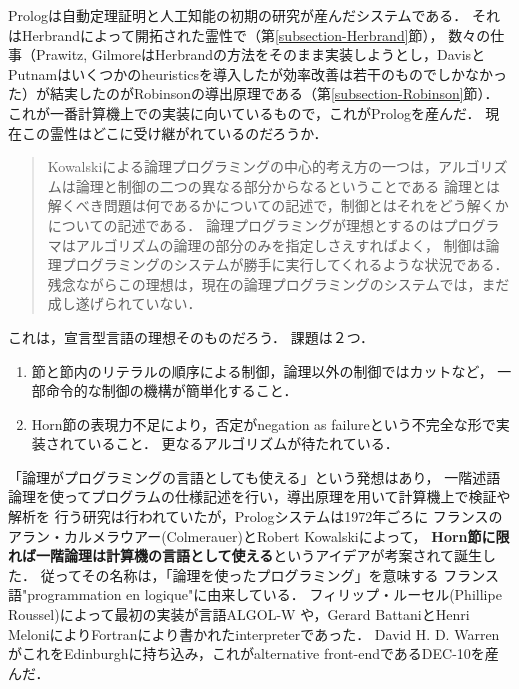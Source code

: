 \documentclass[uplatex, dvipdfmx]{jsreport}
\begin{document}
\begin{screen}
Prologは自動定理証明と人工知能の初期の研究が産んだシステムである．
それはHerbrandによって開拓された霊性で（第\ref{subsection-Herbrand}節），
数々の仕事（Prawitz, GilmoreはHerbrandの方法をそのまま実装しようとし，DavisとPutnamはいくつかのheuristicsを導入したが効率改善は若干のものでしかなかった）が結実したのがRobinsonの導出原理である（第\ref{subsection-Robinson}節）．
これが一番計算機上での実装に向いているもので，これがPrologを産んだ．
現在この霊性はどこに受け継がれているのだろうか．
\begin{quote}
    Kowalskiによる論理プログラミングの中心的考え方の一つは，アルゴリズムは論理と制御の二つの異なる部分からなるということである
    論理とは解くべき問題は何であるかについての記述で，制御とはそれをどう解くかについての記述である．
    論理プログラミングが理想とするのはプログラマはアルゴリズムの論理の部分のみを指定しさえすればよく，
    制御は論理プログラミングのシステムが勝手に実行してくれるような状況である．
    残念ながらこの理想は，現在の論理プログラミングのシステムでは，まだ成し遂げられていない\cite{論理プログラミングの基礎}\cite{知識と推論}．
\end{quote}
これは，宣言型言語の理想そのものだろう．
課題は２つ．
\begin{enumerate}
    \item 節と節内のリテラルの順序による制御，論理以外の制御ではカットなど，
    一部命令的な制御の機構が簡単化すること．
    \item Horn節の表現力不足により，否定がnegation as failureという不完全な形で実装されていること．
    更なるアルゴリズムが待たれている．
\end{enumerate}
\end{screen}

\begin{history}[Prolog]
    「論理がプログラミングの言語としても使える」という発想\cite{Kowalski}はあり，
    一階述語論理を使ってプログラムの仕様記述を行い，導出原理を用いて計算機上で検証や解析を
    行う研究は行われていたが，Prologシステムは1972年ごろに
    フランスのアラン・カルメラウアー(Colmerauer)とRobert Kowalskiによって，
    \textbf{Horn節に限れば一階論理は計算機の言語として使える}というアイデアが考案されて誕生した．
    従ってその名称は，「論理を使ったプログラミング」を意味する
    フランス語"programmation en logique"に由来している．
    フィリップ・ルーセル(Phillipe Roussel)によって最初の実装が言語ALGOL-W
    や，Gerard BattaniとHenri MeloniによりFortranにより書かれたinterpreterであった．
    David H. D. WarrenがこれをEdinburghに持ち込み，これがalternative front-endであるDEC-10を産んだ．
\end{history}
\end{document}
